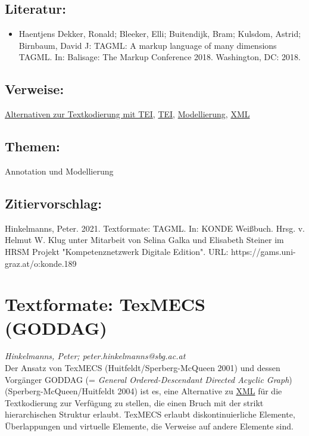\documentclass{article}
\begin{document}
        \subsection*{Literatur:}\begin{itemize}\item Haentjens Dekker, Ronald; Bleeker, Elli; Buitendijk, Bram; Kulsdom, Astrid; Birnbaum, David J: TAGML: A markup language of many dimensions TAGML. In: Balisage: The Markup Conference 2018. Washington, DC: 2018.\end{itemize}\subsection*{Verweise:}\href{https://gams.uni-graz.at/o:konde.15}{Alternativen zur Textkodierung mit TEI}, \href{https://gams.uni-graz.at/o:konde.178}{TEI}, \href{https://gams.uni-graz.at/o:konde.137}{Modellierung}, \href{https://gams.uni-graz.at/o:konde.215}{XML}\subsection*{Themen:}Annotation und Modellierung\subsection*{Zitiervorschlag:}Hinkelmanns, Peter. 2021. Textformate: TAGML. In: KONDE Weißbuch. Hrsg. v. Helmut W. Klug unter Mitarbeit von Selina Galka und Elisabeth Steiner im HRSM Projekt "Kompetenznetzwerk Digitale Edition". URL: https://gams.uni-graz.at/o:konde.189\newpage\section*{Textformate: TexMECS (GODDAG)} \emph{Hinkelmanns, Peter; peter.hinkelmanns@sbg.ac.at}\\
        
    Der Ansatz von TexMECS (Huitfeldt/Sperberg-McQueen 2001) und dessen Vorgänger GODDAG (= \emph{General Ordered-Descendant Directed Acyclic Graph}) (Sperberg-McQueen/Huitfeldt 2004) ist es, eine Alternative zu \href{http://gams.uni-graz.at/o:konde.215}{XML} für die Textkodierung zur Verfügung zu stellen, die einen Bruch mit der strikt hierarchischen Struktur erlaubt. TexMECS erlaubt diskontinuierliche Elemente, Überlappungen und virtuelle Elemente, die Verweise auf andere Elemente sind.\\
            
\end{document}
